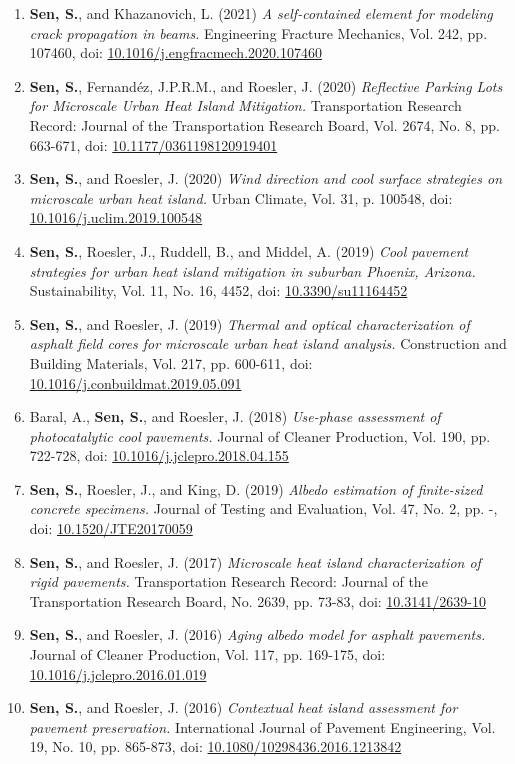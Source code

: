\documentclass[12pt]{article}
\begin{document}
\begin{enumerate}
	\item \textbf{Sen, S.}, and Khazanovich, L. (2021) \textit{A self-contained element for modeling crack propagation in beams.} Engineering Fracture Mechanics, Vol. 242, pp. 107460, doi: \href{https://doi.org/10.1016/j.engfracmech.2020.107460}{10.1016/j.engfracmech.2020.107460}			
	\item \textbf{Sen, S.}, Fernand\'ez, J.P.R.M., and Roesler, J. (2020) \textit{Reflective Parking Lots for Microscale Urban Heat Island Mitigation.}  Transportation Research Record: Journal of the Transportation Research Board, Vol. 2674, No. 8, pp. 663-671, doi: \href{https://doi.org/10.1177/0361198120919401}{10.1177/0361198120919401}	
		\item \textbf{Sen, S.}, and Roesler, J. (2020) \textit{Wind direction and cool surface strategies on microscale urban heat island.}  Urban Climate, Vol. 31, p. 100548, doi: \href{https://doi.org/10.1016/j.uclim.2019.100548}{10.1016/j.uclim.2019.100548}
	\item \textbf{Sen, S.}, Roesler, J., Ruddell, B., and Middel, A. (2019) \textit{Cool pavement strategies for urban heat island mitigation in suburban Phoenix, Arizona.}  Sustainability, Vol. 11, No. 16, 4452, doi: \href{https://doi.org/10.3390/su11164452}{10.3390/su11164452}
		\item \textbf{Sen, S.}, and Roesler, J. (2019) \textit{Thermal and optical characterization of asphalt field cores for microscale urban heat island analysis.}  Construction and Building Materials, Vol. 217, pp. 600-611, doi: \href{https://doi.org/10.1016/j.conbuildmat.2019.05.091}{10.1016/j.conbuildmat.2019.05.091}
	\item Baral, A., \textbf{Sen, S.}, and Roesler, J. (2018) \textit{Use-phase assessment of photocatalytic cool pavements.}  Journal of Cleaner Production, Vol. 190, pp. 722-728, doi: \href{https://doi.org/10.1016/j.jclepro.2018.04.155}{10.1016/j.jclepro.2018.04.155}
	\item \textbf{Sen, S.}, Roesler, J., and King, D. (2019) \textit{Albedo estimation of finite-sized concrete specimens.} Journal of Testing and Evaluation, Vol. 47, No. 2, pp. -, doi: \href{https://doi.org/10.1520/JTE20170059}{10.1520/JTE20170059}
	\item \textbf{Sen, S.}, and Roesler, J. (2017) \textit{Microscale heat island characterization of rigid pavements.} Transportation Research Record: Journal of the Transportation Research Board, No. 2639, pp. 73-83, doi: \href{http://dx.doi.org/10.3141/2639-10}{10.3141/2639-10}
	\item \textbf{Sen, S.}, and Roesler, J. (2016) \textit{Aging albedo model for asphalt pavements.} Journal of Cleaner Production, Vol. 117, pp. 169-175, doi: \href{http://dx.doi.org/10.1016/j.jclepro.2016.01.019}{10.1016/j.jclepro.2016.01.019}
	\item \textbf{Sen, S.}, and Roesler, J. (2016) \textit{Contextual heat island assessment for pavement preservation.} International Journal of Pavement Engineering, Vol. 19, No. 10, pp. 865-873, doi: \href{https://www.tandfonline.com/doi/full/10.1080/10298436.2016.1213842}{10.1080/10298436.2016.1213842}
\end{enumerate} 
\end{document}
